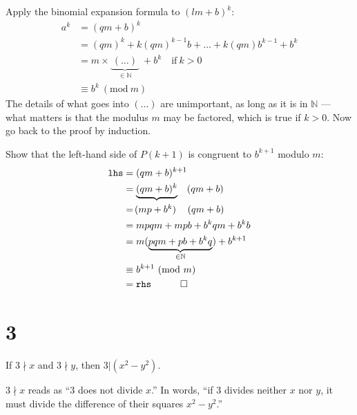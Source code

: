 \documentclass[12pt]{article}
\newcommand{\modulo}[1]{~(\mathrm{mod}~#1)}
\begin{document}
Apply the binomial expansion formula to $(lm+b)^{k}$:
\begin{align*}
a^{k} 
  & = (qm + b)^{k} \\
  & = (qm)^{k} + k (qm)^{k-1}b + \ldots + k (qm)b^{k-1} + b^{k} \\
  & = m \times \underbrace{~(\ldots)~}_{\in\mathbb{N}}~ + b^{k} \quad\text{if}~k>0\\
  & \equiv b^{k} \modulo{m}
\end{align*}
The details of what goes into $(\ldots)$ are unimportant, as long as it is in $\mathbb{N}$ --- what matters is that the modulus $m$ may be factored, which is true if $k>0$. Now go back to the proof by induction. 


Show that the left-hand side of $P(k+1)$ is congruent to $b^{k+1}$ modulo $m$:
\begin{align*}
\texttt{lhs} 
  & = (qm + b)^{k+1} \\
  & = \underbrace{(qm + b)^{k}}\quad(qm + b) \\
  & = \makebox[4em]{$(mp+b^{k})$}\quad~(qm + b) \\
  & = mpqm + mpb + b^{k}qm + b^{k}b \\
  & = m (\underbrace{pqm + pb + b^{k}q}_{\in\mathbb{N}}) +b^{k+1} \\
  & \equiv b^{k+1} \modulo{m} \\
  & = \texttt{rhs} \quad \qed 
\end{align*}



\clearpage
\section*{3}
\begin{question}
If $3\nmid x$ and $3\nmid y$, then $3|(x^{2}-y^{2})$. 
\end{question}

$3\nmid x$ reads as ``$3$ does not divide $x$.'' In words, ``if $3$ divides neither $x$ nor $y$, it must divide the difference of their squares $x^{2}-y^{2}$.''
\end{document}
